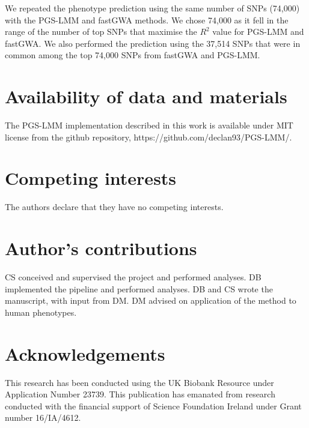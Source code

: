 \documentclass[doublespacing]{bmcart}
\begin{document}
We repeated the phenotype prediction using the same number of SNPs (74,000) with the PGS-LMM and fastGWA methods. We chose 74,000 as it fell in the range of the number of top SNPs that maximise the $R^2$ value for PGS-LMM and fastGWA. We also performed the prediction using the 37,514 SNPs that were in common among the top 74,000 SNPs from fastGWA and PGS-LMM.





\begin{backmatter}
\section*{Availability of data and materials}
The PGS-LMM implementation described in this work is available under MIT license from the github repository, https://github.com/declan93/PGS-LMM/.
\section*{Competing interests}
  The authors declare that they have no competing interests.

\section*{Author's contributions}
CS conceived and supervised the project and performed analyses. DB implemented the pipeline and performed analyses. DB and CS wrote the manuscript, with input from DM. DM advised on application of the method to human phenotypes.
\section*{Acknowledgements}
This research has been conducted using the UK Biobank Resource under Application Number 23739. This publication has emanated from research conducted with the financial support of Science Foundation Ireland under Grant number 16/IA/4612.



\end{backmatter}
\end{document}
